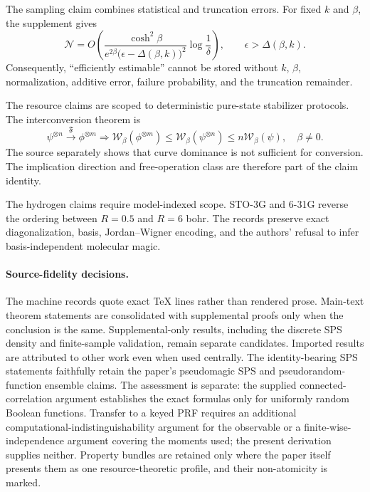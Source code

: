 The sampling claim combines statistical and truncation errors. For fixed $k$ and $\beta$, the supplement gives
\[
\mathcal N=O\!\left(
\frac{\cosh^2\beta}{e^{2\beta}{\bigl(\epsilon-\Delta(\beta,k)\bigr)}^2}
\log\frac1\delta\right),\qquad \epsilon>\Delta(\beta,k).
\]
Consequently, ``efficiently estimable'' cannot be stored without $k$, $\beta$, normalization, additive error, failure probability, and the truncation remainder.

The resource claims are scoped to deterministic pure-state stabilizer protocols. The interconversion theorem is
\[
\psi^{\otimes n}\xrightarrow{\mathfrak F}\phi^{\otimes m}
\Longrightarrow
\mathcal W_\beta(\phi^{\otimes m})
\leq\mathcal W_\beta(\psi^{\otimes n})
\leq n\mathcal W_\beta(\psi),
\quad \beta\neq0.
\]
The source separately shows that curve dominance is not sufficient for conversion. The implication direction and free-operation class are therefore part of the claim identity.

The hydrogen claims require model-indexed scope. STO-3G and 6-31G reverse the ordering between $R=0.5$ and $R=6$ bohr. The records preserve exact diagonalization, basis, Jordan--Wigner encoding, and the authors' refusal to infer basis-independent molecular magic.

\paragraph{Source-fidelity decisions.}
The machine records quote exact TeX lines rather than rendered prose. Main-text theorem statements are consolidated with supplemental proofs only when the conclusion is the same. Supplemental-only results, including the discrete SPS density and finite-sample validation, remain separate candidates. Imported results are attributed to other work even when used centrally. The identity-bearing SPS statements faithfully retain the paper's pseudomagic SPS and pseudorandom-function ensemble claims. The assessment is separate: the supplied connected-correlation argument establishes the exact formulas only for uniformly random Boolean functions. Transfer to a keyed PRF requires an additional computational-indistinguishability argument for the observable or a finite-wise-independence argument covering the moments used; the present derivation supplies neither. Property bundles are retained only where the paper itself presents them as one resource-theoretic profile, and their non-atomicity is marked.

